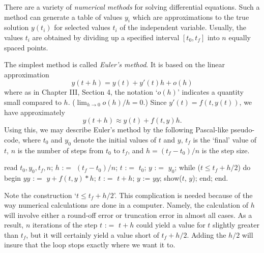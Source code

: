 There are a variety of {\it numerical methods\/} for solving
differential equations.  Such a method can generate a table
%
of values  $y_i$ which are approximations to the true solution
$y(t_i)$ for selected values $t_i$ of the independent variable.
Usually, the values $t_i$ are obtained by dividing up a
specified interval  $[t_0, t_f]$  into $n$ equally spaced
points.
\medskip
\centerline{}
\medskip
The simplest method is called {\it Euler's method}.  It is
%
based on the linear approximation
$$
y(t + h) = y(t) + y'(t)h + o(h)
$$
where as in Chapter III, Section 4,
 the notation `$o(h)$' indicates
a quantity small compared to $h$.  ($\lim_{h\to 0} o(h)/h = 0$.)
Since  $y'(t) = f(t,y(t))$, we have approximately
$$
y(t + h) \approx y(t) + f(t,y)h.
$$
Using this, we may describe Euler's method by the following
Pascal-like pseudo-code, where $t_0$ and $y_0$ denote the
initial values of $t$ and $y$,  $t_f$ is the `final' value
of $t$, $n$ is the number of steps from $t_0$ to $t_f$,
and $h = (t_f - t_0)/n$ is the step size.
\smallskip
\def\hs{\hskip 20pt}
{\obeylines

read $t_0, y_0, t_f, n$;
$h$ :$=$ $(t_f - t_0)/n$;
$t$ :$=$ $t_0$;
$y$ :$=$ $y_0$;
while ($t \le t_f + h/2$) do
\hs begin
\hs\hs $yy$ :$=$ $y + f(t,y)*h$;
\hs\hs $t$ :$=$ $t + h$;
\hs\hs $y$ := $yy$;
\hs\hs show($t$, $y$);
\hs end;
end.
}
\smallskip
{}
Note the construction `$t \le t_f + h/2$'.   This complication
is needed
 because of the way numerical
calculations are done in a computer. 
 Namely, the calculation of $h$ will involve either
a round-off error or truncation error in almost all cases.  As
a result,  $n$ iterations of the step $t$ :$=$ $t + h$
could yield a value for $t$ slightly greater than $t_f$, but it
will certainly yield a value short of $t_f + h/2$. 
Adding the $h/2$ will insure that the loop stops exactly where we
want it to.

